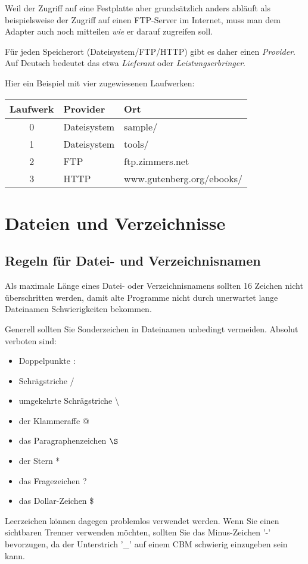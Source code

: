 \documentclass[10pt,a4paper]{scrartcl}		%
\begin{document}
Weil der Zugriff auf eine Festplatte aber grundsätzlich anders abläuft
als beispielsweise der Zugriff auf einen FTP-Server im Internet, 
muss man dem Adapter auch noch mitteilen \textit{wie} er darauf
zugreifen soll.

Für jeden Speicherort (Dateisystem/FTP/HTTP) gibt es daher einen 
\textit{Provider}. Auf Deutsch bedeutet das etwa \textit{Lieferant}
oder \textit{Leistungserbringer}. 

Hier ein Beispiel mit vier zugewiesenen Laufwerken:

\begin{tabular}[c]{c l l}
\toprule
Laufwerk & Provider & Ort \\
\midrule
0 & Dateisystem & sample/ \\
1 & Dateisystem & tools/ \\
2 & FTP & ftp.zimmers.net \\
3 & HTTP & www.gutenberg.org/ebooks/ \\
\bottomrule
\end{tabular}

\clearpage
\section{Dateien und Verzeichnisse}
\subsection{Regeln für Datei- und Verzeichnisnamen}
Als maximale Länge eines Datei- oder Verzeichnisnamens sollten
16 Zeichen nicht überschritten werden, damit alte Programme nicht
durch unerwartet lange Dateinamen Schwierigkeiten bekommen.

Generell sollten Sie Sonderzeichen in Dateinamen unbedingt 
vermeiden. Absolut verboten sind:
\begin{itemize}
\item Doppelpunkte :
\item Schrägstriche /
\item umgekehrte Schrägstriche \textbackslash
\item der Klammeraffe @
\item das Paragraphenzeichen $\S$
\item der Stern *
\item das Fragezeichen ? 
\item das Dollar-Zeichen \$
\end{itemize}
Leerzeichen können dagegen problemlos verwendet werden.
Wenn Sie einen sichtbaren Trenner verwenden möchten, sollten
Sie das Minus-Zeichen '-' bevorzugen, da der Unterstrich '\_' 
auf einem CBM schwierig einzugeben sein kann.
\end{document}
